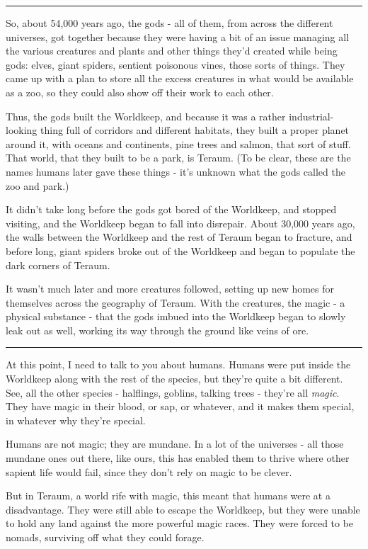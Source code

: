 \documentclass[11pt]{article}
\begin{document}
\noindent\rule{\textwidth}{0.5pt}

So, about 54,000 years ago, the gods - all of them, from across the
different universes, got together because they were having a bit of an
issue managing all the various creatures and plants and other things
they'd created while being gods: elves, giant spiders, sentient
poisonous vines, those sorts of things. They came up with a plan to
store all the excess creatures in what would be available as a zoo, so
they could also show off their work to each other.

Thus, the gods built the Worldkeep, and because it was a rather
industrial-looking thing full of corridors and different habitats,
they built a proper planet around it, with oceans and continents, pine
trees and salmon, that sort of stuff. That world, that they built to
be a park, is Teraum. (To be clear, these are the names humans later
gave these things - it's unknown what the gods called the zoo and
park.)

It didn't take long before the gods got bored of the Worldkeep, and
stopped visiting, and the Worldkeep began to fall into disrepair.
About 30,000 years ago, the walls between the Worldkeep and the rest
of Teraum began to fracture, and before long, giant spiders broke out
of the Worldkeep and began to populate the dark corners of Teraum.

It wasn't much later and more creatures followed, setting up new homes
for themselves across the geography of Teraum. With the creatures, the
magic - a physical substance - that the gods imbued into the Worldkeep
began to slowly leak out as well, working its way through the ground
like veins of ore.

\noindent\rule{\textwidth}{0.5pt}

At this point, I need to talk to you about humans. Humans were put
inside the Worldkeep along with the rest of the species, but they're
quite a bit different. See, all the other species - halflings,
goblins, talking trees - they're all \emph{magic}. They have magic in their
blood, or sap, or whatever, and it makes them special, in whatever why
they're special.

Humans are not magic; they are mundane. In a lot of the universes -
all those mundane ones out there, like ours, this has enabled them to
thrive where other sapient life would fail, since they don't rely on
magic to be clever.

But in Teraum, a world rife with magic, this meant that humans were at
a disadvantage. They were still able to escape the Worldkeep, but they
were unable to hold any land against the more powerful magic races.
They were forced to be nomads, surviving off what they could forage.
\end{document}
